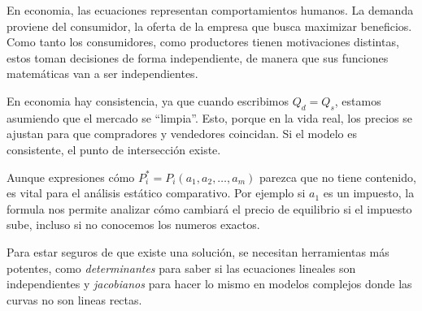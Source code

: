 En economia, las ecuaciones representan comportamientos humanos. La demanda proviene del consumidor, la oferta de la empresa que busca maximizar beneficios. Como tanto los consumidores, como productores tienen motivaciones distintas, estos toman decisiones de forma independiente, de manera que sus funciones matemáticas van a ser independientes. 

En economia hay consistencia, ya que cuando escribimos \(Q_d=Q_s\), estamos asumiendo que el mercado se ``limpia''. Esto, porque en la vida real, los precios se ajustan para que compradores y vendedores coincidan. Si el modelo es consistente, el punto de intersección existe.

Aunque expresiones cómo \(P_i^*=P_i(a_1,a_2,\dots,a_m)\) parezca que no tiene contenido, es vital para el análisis estático comparativo. Por ejemplo si \(a_1\) es un impuesto, la formula nos permite analizar cómo cambiará el precio de equilibrio si el impuesto sube, incluso si no conocemos los numeros exactos.

Para estar seguros de que existe una solución, se necesitan herramientas más potentes, como \textit{determinantes} para saber si las ecuaciones lineales son independientes y \textit{jacobianos} para hacer lo mismo en modelos complejos donde las curvas no son lineas rectas.

